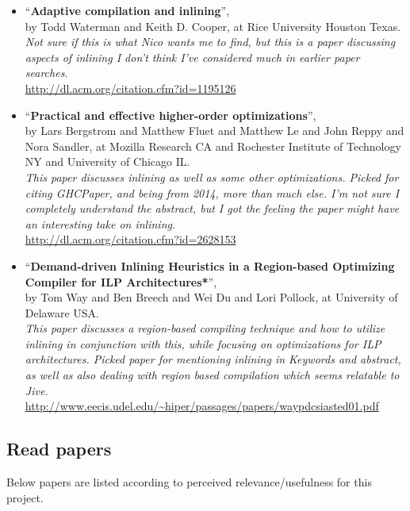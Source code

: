 \begin{itemize}
	\item ``\textbf{Adaptive compilation and inlining}'', \\ by Todd Waterman
and Keith D. Cooper, at Rice University Houston Texas. \\
\textit{Not sure if this is what Nico wants me to find, but this is a paper
discussing aspects of inlining I don't think I've considered much in earlier
paper searches.}\\
\url{http://dl.acm.org/citation.cfm?id=1195126}

	\item ``\textbf{Practical and effective higher-order optimizations}'', \\ by
Lars Bergstrom and Matthew Fluet and Matthew Le and John Reppy and Nora Sandler,
at Mozilla Research CA and Rochester Institute of Technology NY and University
of Chicago IL. \\
\textit{This paper discusses inlining as well as some other optimizations.
Picked for citing GHCPaper, and being from 2014, more than much else.
I'm not sure I completely understand the abstract, but I got the feeling the
paper might have an interesting take on inlining.} \\
\url{http://dl.acm.org/citation.cfm?id=2628153}

	\item ``\textbf{Demand-driven Inlining Heuristics in a Region-based
Optimizing Compiler for ILP Architectures*}'', \\ by Tom Way and Ben Breech and
Wei Du and Lori Pollock, at University of Delaware USA. \\
\textit{This paper discusses a region-based compiling technique and how to
utilize inlining in conjunction with this, while focusing on optimizations for
ILP architectures. Picked paper for mentioning inlining in Keywords and
abstract, as well as also dealing with region based compilation which seems
relatable to Jive.} \\
\url{http://www.eecis.udel.edu/~hiper/passages/papers/waypdcsiasted01.pdf}

\end{itemize}

\subsection{Read papers}

Below papers are listed according to perceived relevance/usefulness for this
project.\\


